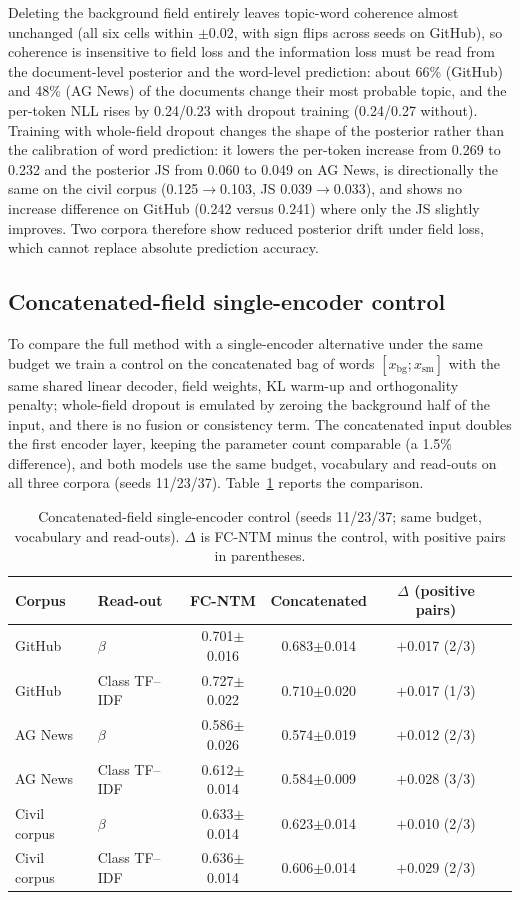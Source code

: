 \documentclass[11pt]{article}
\newcommand{\fcntm}{FC-NTM}
\begin{document}
Deleting the background field entirely leaves topic-word coherence almost unchanged (all six cells
within $\pm0.02$, with sign flips across seeds on GitHub), so coherence is insensitive to field
loss and the information loss must be read from the document-level posterior and the word-level
prediction: about 66\% (GitHub) and 48\% (AG News) of the documents change their most probable
topic, and the per-token NLL rises by 0.24/0.23 with dropout training (0.24/0.27 without).
Training with whole-field dropout changes the shape of the posterior rather than the calibration of
word prediction: it lowers the per-token increase from 0.269 to 0.232 and the posterior JS from
0.060 to 0.049 on AG News, is directionally the same on the civil corpus
(0.125$\to$0.103, JS 0.039$\to$0.033), and shows no increase difference on GitHub
(0.242 versus 0.241) where only the JS slightly improves. Two corpora therefore show reduced
posterior drift under field loss, which cannot replace absolute prediction accuracy.

\subsection{Concatenated-field single-encoder control}

To compare the full method with a single-encoder alternative under the same budget we train a
control on the concatenated bag of words $[x_{\mathrm{bg}};x_{\mathrm{sm}}]$ with the same shared
linear decoder, field weights, KL warm-up and orthogonality penalty; whole-field dropout is
emulated by zeroing the background half of the input, and there is no fusion or consistency
term. The concatenated input doubles the first encoder layer, keeping the parameter count
comparable (a 1.5\% difference), and both models use the same budget, vocabulary and read-outs
on all three corpora (seeds 11/23/37).
Table~\ref{tab:concat} reports the comparison.

\begin{table}[t]
\centering
\caption{Concatenated-field single-encoder control (seeds 11/23/37; same budget, vocabulary and read-outs). $\Delta$ is \fcntm{} minus the control, with positive pairs in parentheses.}
\label{tab:concat}
\small
\begin{tabular}{llcccc}
\toprule
Corpus & Read-out & \fcntm{} & Concatenated & $\Delta$ (positive pairs) \\
\midrule
GitHub & $\beta$ & 0.701$\pm$0.016 & 0.683$\pm$0.014 & $+$0.017 (2/3) \\
GitHub & Class TF--IDF & 0.727$\pm$0.022 & 0.710$\pm$0.020 & $+$0.017 (1/3) \\
AG News & $\beta$ & 0.586$\pm$0.026 & 0.574$\pm$0.019 & $+$0.012 (2/3) \\
AG News & Class TF--IDF & 0.612$\pm$0.014 & 0.584$\pm$0.009 & $+$0.028 (3/3) \\
Civil corpus & $\beta$ & 0.633$\pm$0.014 & 0.623$\pm$0.014 & $+$0.010 (2/3) \\
Civil corpus & Class TF--IDF & 0.636$\pm$0.014 & 0.606$\pm$0.014 & $+$0.029 (2/3) \\
\bottomrule
\end{tabular}
\end{table}
\end{document}
